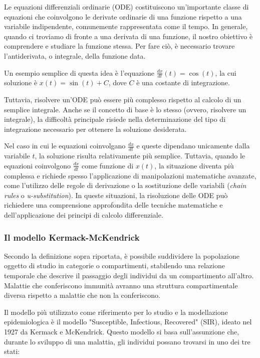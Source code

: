 Le equazioni differenziali ordinarie (ODE) costituiscono un'importante 
classe di equazioni che coinvolgono le derivate ordinarie di una funzione 
rispetto a una variabile indipendente, comunemente rappresentata come il 
tempo. In generale, quando ci troviamo di fronte a una derivata di una 
funzione, il nostro obiettivo è comprendere e studiare la funzione stessa. 
Per fare ciò, è necessario trovare l'antiderivata, o integrale, della 
funzione data.

Un esempio semplice di questa idea è l'equazione 
$\frac{dx}{dt}(t) = \cos(t)$, la cui soluzione è $x(t) = \sin(t) + C$, 
dove $C$ è una costante di integrazione.

Tuttavia, risolvere un'ODE può essere più complesso rispetto al calcolo 
di un semplice integrale. Anche se il concetto di base è lo stesso 
(ovvero, risolvere un integrale), la difficoltà principale risiede 
nella determinazione del tipo di integrazione necessario per ottenere 
la soluzione desiderata.

Nel caso in cui le equazioni coinvolgano $\frac{dx}{dt}$ e queste 
dipendano unicamente dalla variabile $t$, la soluzione risulta 
relativamente più semplice. Tuttavia, quando le equazioni coinvolgono 
$\frac{dx}{dt}$ come funzione di $x(t)$, la situazione diventa più 
complessa e richiede spesso l'applicazione di manipolazioni matematiche 
avanzate, come l'utilizzo delle regole di derivazione o la sostituzione 
delle variabili (\emph{chain rules} o \emph{u-substitution}). In queste situazioni, 
la risoluzione delle ODE può richiedere una comprensione approfondita 
delle tecniche matematiche e dell'applicazione dei principi di calcolo 
differenziale.

\subsubsection{Il modello Kermack-McKendrick}

Secondo la definizione sopra riportata, è possibile suddividere la 
popolazione oggetto di studio in categorie o compartimenti, stabilendo 
una relazione temporale che descrive il passaggio degli individui da un 
compartimento all'altro. Malattie che conferiscono immunità avranno una 
struttura compartimentale diversa rispetto a malattie che non la 
conferiscono.

Il modello più utilizzato come riferimento per lo studio e la 
modellazione epidemiologica è il modello "Susceptible, Infectious, 
Recovered" (SIR), ideato nel 1927 da Kermack e McKendrick. 
Questo modello si basa sull'assunzione che, durante lo sviluppo di una 
malattia, gli individui possano trovarsi in uno dei tre stati:


